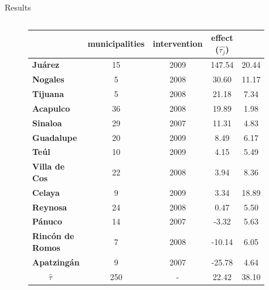 \documentclass[final]{beamer}
\newlength{\sepwid}
\newlength{\onecolwid}
\newlength{\twocolwid}
\begin{document}
\begin{frame}[t]
\begin{columns}[t]
\begin{column}{\twocolwid}
\begin{block}{Results}
\begin{columns}[t,totalwidth=\twocolwid]
\begin{column}{\onecolwid}
\begin{figure}[htdp]
{\begin{minipage}[ht]{0.58\linewidth}
{\begin{tabular}{lcccc}
                    & municipalities& intervention&  effect ($\hat{\tau_j}$)& \\ 
					  \hline
					\textbf{Ju\'{a}rez} &  15 & 2009 & 147.54 &20.44 \\ %
					 \textbf{Nogales}  &   5 & 2008 & 30.60 & 11.17 \\ %
					  \textbf{Tijuana} &   5 & 2008 & 21.18 & 7.34\\ %
					  \textbf{Acapulco}   &  36 & 2008 & 19.89 & 1.98 \\ %
					\textbf{Sinaloa}  &  29 & 2007 & 11.31 & 4.83 \\ %
					  \textbf{Guadalupe}  &  20 & 2009 & 8.49 & 6.17 \\ %
					   \textbf{Te\'{u}l}&  10 & 2009 & 4.15 & 5.49 \\ %
					 \textbf{Villa de Cos}  &  22 & 2008 & 3.94 & 8.36 \\ %
					    \textbf{Celaya} &   9 & 2009 & 3.34 & 18.89 \\ %
					   \textbf{Reynosa}  &  24 & 2008 & 0.47 & 5.50 \\ %
					   \textbf{P\'{a}nuco}  &  14 & 2007 & -3.32 & 5.63 \\ %
					   \textbf{Rinc\'{o}n de Romos}  &   7 & 2008 & -10.14 &6.05 \\ %
					   \textbf{Apatzing\'{a}n}  &   9 & 2007 & -25.78 & 4.64 \\%
					\hline
					\hline 
					  $\quad \quad \hat{\tau}$  & 250 & - & 22.42 & 38.10 \\ 
					   \hline
					\end{tabular}}
	              \end{minipage}\hfill
	            }
	            \end{figure}
	          \end{column}
	        \end{columns}
	      \end{block}
    \end{column}


    \begin{column}{\sepwid}\end{column}	



\end{columns}
\end{frame}
\end{document}
